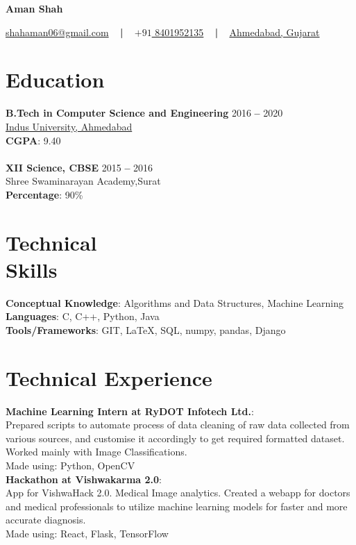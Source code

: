 \documentclass[margin, centered]{res}
\begin{document}
	\begin{center}
		\hspace{-\hoffset}
		\huge\textbf{Aman Shah}
	\end{center}
	\begin{center}
		\hspace{-\hoffset}
		\href{mailto:shahaman06@gmail.com}{shahaman06@gmail.com}
		~ \textbf{|} ~
		\href{tel:+918401952135}{\(+91\) 8401952135}
		~ \textbf{|} ~
		\href{https://goo.gl/maps/QqRrJzxewF82}{Ahmedabad, Gujarat}
	\end{center}

	\begin{resume}
		\section{Education}
			\textbf{B.Tech in Computer Science and Engineering} \hfill 2016 \textbf{--} 2020 \\
			\href{https://www.indusuni.ac.in/}{Indus University, Ahmedabad}\\
			\textbf{CGPA}: 9.40\\ %
			\\
			\textbf{XII Science, CBSE} \hfill 2015 \textbf{--} 2016 \\
			Shree Swaminarayan Academy,Surat \\
			\textbf{Percentage}: 90\%
		
		\section{Technical \\ Skills}
			\textbf{Conceptual Knowledge}: Algorithms and Data Structures, Machine Learning\\
			\textbf{Languages}: C, C++, Python, Java \\
			\textbf{Tools/Frameworks}: GIT, \LaTeX, SQL, numpy, pandas, Django
		
		\section{Technical Experience}
			\textbf{Machine Learning Intern at RyDOT Infotech Ltd.}:\\
			Prepared scripts to automate process of data cleaning of raw data collected from \\various sources, and customise it accordingly to get required formatted dataset. Worked mainly with Image Classifications.\\
			Made using: Python, OpenCV\\
			\textbf{Hackathon at Vishwakarma 2.0}:\\
			App for VishwaHack 2.0. Medical Image analytics. Created a webapp for doctors and medical professionals to utilize machine learning models for faster and more accurate diagnosis.\\
			Made using: React, Flask, TensorFlow


\end{resume}
\end{document}
